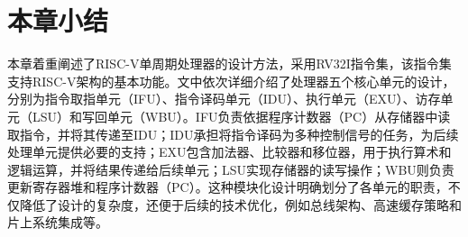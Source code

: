 \section{本章小结}
本章着重阐述了RISC-V单周期处理器的设计方法，采用RV32I指令集，该指令集支持RISC-V架构的基本功能。文中依次详细介绍了处理器五个核心单元的设计，分别为指令取指单元（IFU）、指令译码单元（IDU）、执行单元（EXU）、访存单元（LSU）和写回单元（WBU）。IFU负责依据程序计数器（PC）从存储器中读取指令，并将其传递至IDU；IDU承担将指令译码为多种控制信号的任务，为后续处理单元提供必要的支持；EXU包含加法器、比较器和移位器，用于执行算术和逻辑运算，并将结果传递给后续单元；LSU实现存储器的读写操作；WBU则负责更新寄存器堆和程序计数器（PC）。这种模块化设计明确划分了各单元的职责，不仅降低了设计的复杂度，还便于后续的技术优化，例如总线架构、高速缓存策略和片上系统集成等。
